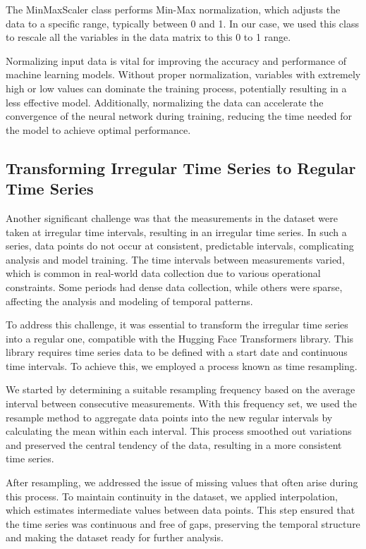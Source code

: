 The MinMaxScaler class performs Min-Max normalization, which adjusts the data to a specific range, typically between 0 and 1. In our case, we used this class to rescale all the variables in the data matrix to this 0 to 1 range.

Normalizing input data is vital for improving the accuracy and performance of machine learning models. Without proper normalization, variables with extremely high or low values can dominate the training process, potentially resulting in a less effective model. Additionally, normalizing the data can accelerate the convergence of the neural network during training, reducing the time needed for the model to achieve optimal performance.

\subsection{Transforming Irregular Time Series to Regular Time Series}

Another significant challenge was that the measurements in the dataset were taken at irregular time intervals, resulting in an irregular time series. In such a series, data points do not occur at consistent, predictable intervals, complicating analysis and model training. The time intervals between measurements varied, which is common in real-world data collection due to various operational constraints. Some periods had dense data collection, while others were sparse, affecting the analysis and modeling of temporal patterns.

To address this challenge, it was essential to transform the irregular time series into a regular one, compatible with the Hugging Face Transformers library. This library requires time series data to be defined with a start date and continuous time intervals. To achieve this, we employed a process known as time resampling.

We started by determining a suitable resampling frequency based on the average interval between consecutive measurements. With this frequency set, we used the resample method to aggregate data points into the new regular intervals by calculating the mean within each interval. This process smoothed out variations and preserved the central tendency of the data, resulting in a more consistent time series.

After resampling, we addressed the issue of missing values that often arise during this process. To maintain continuity in the dataset, we applied interpolation, which estimates intermediate values between data points. This step ensured that the time series was continuous and free of gaps, preserving the temporal structure and making the dataset ready for further analysis.

